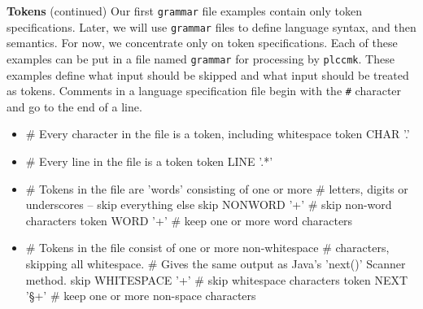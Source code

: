 \begin{minipage}[t]{\sw}
\slidenumber
\LARGE
{\bf Tokens} (continued)\exx
Our first \verb'grammar' file examples contain only
token specifications.
Later, we will use \verb'grammar' files
to define language syntax, and then semantics.
For now, we concentrate only on token specifications.\exx
Each of these examples can be put in a file named \verb'grammar'
for processing by \verb'plccmk'.
These examples define what input should be skipped
and what input should be treated as tokens.
Comments in a language specification file begin
with the \verb'#' character and go to the end of a line.
{\Large
\begin{itemize}
\item
\begin{qv}
# Every character in the file is a token, including whitespace
token CHAR '.'
\end{qv}
\item
\begin{qv}
# Every line in the file is a token
token LINE '.*'
\end{qv}
\item
\begin{qv}
# Tokens in the file are 'words' consisting of one or more
# letters, digits or underscores -- skip everything else
skip NONWORD '\W+'  # skip non-word characters
token WORD '\w+'    # keep one or more word characters
\end{qv}
\item
\begin{qv}
# Tokens in the file consist of one or more non-whitespace
# characters, skipping all whitespace.
# Gives the same output as Java's 'next()' Scanner method.
skip WHITESPACE '\s+'  # skip whitespace characters
token NEXT '\S+'       # keep one or more non-space characters
\end{qv}
\end{itemize}
}
\end{minipage}
\clearpage
